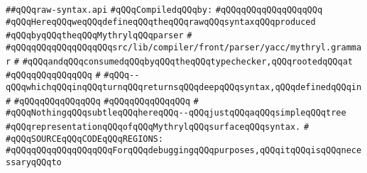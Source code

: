 \label{src/lib/compiler/front/parser/raw-syntax/raw-syntax.api}
\verb|##qQQqraw-syntax.api|\newline
\newline
\verb|#qQQqCompiledqQQqby:|\newline
\verb|#qQQqqQQqqQQqqQQqqQQq|\newline
\newline
\newline
\newline
\verb|#qQQqHereqQQqweqQQqdefineqQQqtheqQQqrawqQQqsyntaxqQQqproduced|\newline
\verb|#qQQqbyqQQqtheqQQqMythrylqQQqparser|\newline
\verb|#|\newline
\verb|#qQQqqQQqqQQqqQQqqQQqsrc/lib/compiler/front/parser/yacc/mythryl.grammar|\newline
\verb|#|\newline
\verb|#qQQqandqQQqconsumedqQQqbyqQQqtheqQQqtypechecker,qQQqrootedqQQqat|\newline
\verb|#qQQqqQQqqQQqqQQq|\newline
\verb|#|\newline
\verb|#qQQq--qQQqwhichqQQqinqQQqturnqQQqreturnsqQQqdeepqQQqsyntax,qQQqdefinedqQQqin|\newline
\verb|#|\newline
\verb|#qQQqqQQqqQQqqQQq|\newline
\verb|#qQQqqQQqqQQqqQQq|\newline
\verb|#|\newline
\verb|#qQQqNothingqQQqsubtleqQQqhereqQQq--qQQqjustqQQqaqQQqsimpleqQQqtree|\newline
\verb|#qQQqrepresentationqQQqofqQQqMythrylqQQqsurfaceqQQqsyntax.|\newline
\verb|#|\newline
\verb|#qQQqSOURCEqQQqCODEqQQqREGIONS:|\newline
\verb|#qQQqqQQqqQQqqQQqqQQqForqQQqdebuggingqQQqpurposes,qQQqitqQQqisqQQqnecessaryqQQqto|\newline
